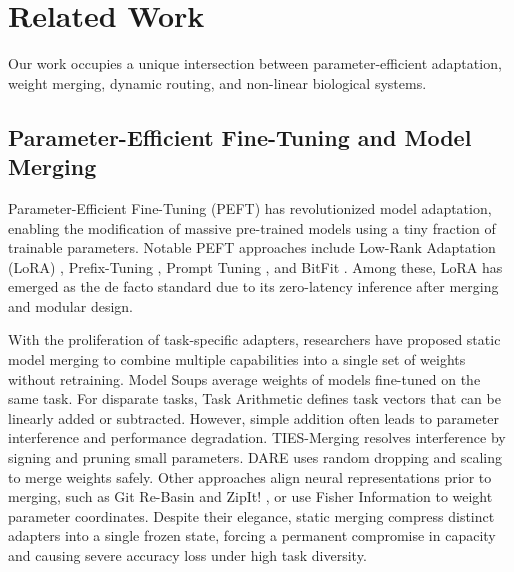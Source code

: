 \section{Related Work}
\label{sec:related_work}

Our work occupies a unique intersection between parameter-efficient adaptation, weight merging, dynamic routing, and non-linear biological systems.

\subsection{Parameter-Efficient Fine-Tuning and Model Merging}
Parameter-Efficient Fine-Tuning (PEFT) has revolutionized model adaptation, enabling the modification of massive pre-trained models using a tiny fraction of trainable parameters. Notable PEFT approaches include Low-Rank Adaptation (LoRA) \cite{hu2021lora}, Prefix-Tuning \cite{li2021prefix}, Prompt Tuning \cite{lester2021power}, and BitFit \cite{zaken2021bitfit}. Among these, LoRA has emerged as the de facto standard due to its zero-latency inference after merging and modular design.

With the proliferation of task-specific adapters, researchers have proposed static model merging to combine multiple capabilities into a single set of weights without retraining. 
Model Soups \cite{wortsman2022model} average weights of models fine-tuned on the same task. For disparate tasks, Task Arithmetic \cite{ilharco2022editing} defines task vectors that can be linearly added or subtracted. 
However, simple addition often leads to parameter interference and performance degradation. 
TIES-Merging \cite{yadav2023ties} resolves interference by signing and pruning small parameters. 
DARE \cite{yu2023dare} uses random dropping and scaling to merge weights safely. 
Other approaches align neural representations prior to merging, such as Git Re-Basin \cite{ainsworth2022git} and ZipIt! \cite{stoica2023zipit}, or use Fisher Information \cite{matena2021merging} to weight parameter coordinates. 
Despite their elegance, static merging compress distinct adapters into a single frozen state, forcing a permanent compromise in capacity and causing severe accuracy loss under high task diversity.

